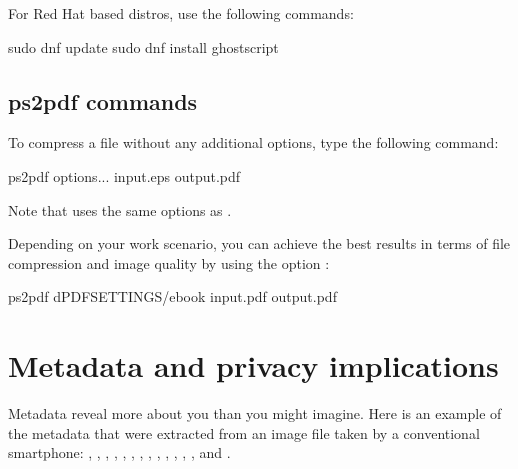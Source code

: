 \documentclass[a4paper,10pt,english,openany,oneside]{sphinxmanual}
\begin{document}
\sphinxAtStartPar
For Red Hat based distros, use the following commands:

\begin{sphinxVerbatim}[commandchars=\\\{\}]
sudo dnf update
sudo dnf install ghostscript
\end{sphinxVerbatim}


\section{ps2pdf commands}
\label{\detokenize{metadata-compression:ps2pdf-commands}}
\sphinxAtStartPar
To compress a file without any additional options, type the following command:

\begin{sphinxVerbatim}[commandchars=\\\{\}]
ps2pdf  \PYG{o}{[}options...\PYG{o}{]} input.\PYG{o}{[}e\PYG{o}{]}ps\PYGZhy{} \PYG{o}{[}output.pdf\PYGZhy{}\PYG{o}{]}
\end{sphinxVerbatim}

\sphinxAtStartPar
Note that  uses the same options as .

\sphinxAtStartPar
Depending on your work scenario, you can achieve the best results in terms of file compression and image quality by using the option :

\begin{sphinxVerbatim}[commandchars=\\\{\}]
ps2pdf \PYGZhy{}dPDFSETTINGS/ebook input.pdf output.pdf
\end{sphinxVerbatim}


\chapter{Metadata and privacy implications}
\label{\detokenize{metadata-compression:metadata-and-privacy-implications}}
\sphinxAtStartPar
Metadata reveal more about you than you might imagine. Here is an example of the metadata that were extracted from an image file taken by a conventional smartphone: , , , , , , , , , , , , , and .
\end{document}
